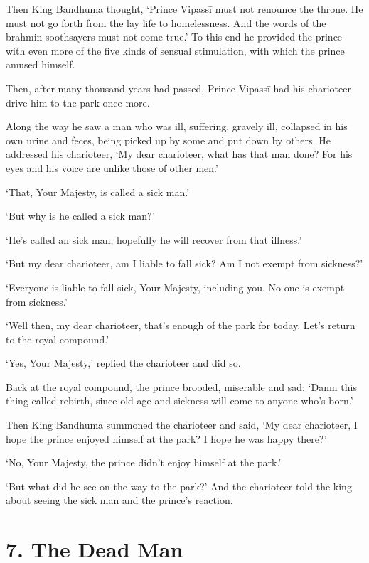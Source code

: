 \documentclass[12pt,openany]{book}%
\begin{document}
Then King Bandhuma thought, ‘Prince \textsanskrit{Vipassī} must not renounce the throne. He must not go forth from the lay life to homelessness. And the words of the brahmin soothsayers must not come true.’ To this end he provided the prince with even more of the five kinds of sensual stimulation, with which the prince amused himself. 

Then, after many thousand years had passed, Prince \textsanskrit{Vipassī} had his charioteer drive him to the park once more. 

Along the way he saw a man who was ill, suffering, gravely ill, collapsed in his own urine and feces, being picked up by some and put down by others. He addressed his charioteer, ‘My dear charioteer, what has that man done? For his eyes and his voice are unlike those of other men.’ 

‘That, Your Majesty, is called a sick man.’ 

‘But why is he called a sick man?’ 

‘He’s called an sick man; hopefully he will recover from that illness.’ 

‘But my dear charioteer, am I liable to fall sick? Am I not exempt from sickness?’ 

‘Everyone is liable to fall sick, Your Majesty, including you. No-one is exempt from sickness.’ 

‘Well then, my dear charioteer, that’s enough of the park for today. Let’s return to the royal compound.’ 

‘Yes, Your Majesty,’ replied the charioteer and did so. 

Back at the royal compound, the prince brooded, miserable and sad: ‘Damn this thing called rebirth, since old age and sickness will come to anyone who’s born.’ 

Then King Bandhuma summoned the charioteer and said, ‘My dear charioteer, I hope the prince enjoyed himself at the park? I hope he was happy there?’ 

‘No, Your Majesty, the prince didn’t enjoy himself at the park.’ 

‘But what did he see on the way to the park?’ And the charioteer told the king about seeing the sick man and the prince’s reaction. 

\section*{7. The Dead Man }
\end{document}
